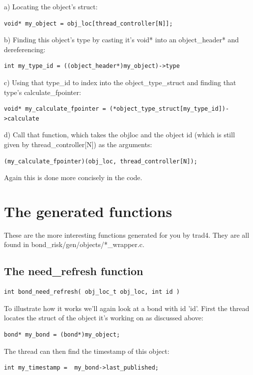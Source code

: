 \documentclass{report}
\begin{document}
a) Locating the object's struct:
\begin{verbatim}
void* my_object = obj_loc[thread_controller[N]];
\end{verbatim}

b) Finding this object's type by casting it's void* into an object_header* and dereferencing:
\begin{verbatim}
int my_type_id = ((object_header*)my_object)->type  
\end{verbatim}

c) Using that type_id to index into the object_type_struct and finding that type's calculate_fpointer:
\begin{verbatim}
void* my_calculate_fpointer = (*object_type_struct[my_type_id])->calculate
\end{verbatim}

d) Call that function, which takes the objloc and the object id (which is still given by thread_controller[N]) as the arguments:
\begin{verbatim}
(my_calculate_fpointer)(obj_loc, thread_controller[N]);
\end{verbatim}

Again this is done more concisely in the code.

\section{The generated functions}

These are the more interesting functions generated for you by trad4. They are all found in bond_risk/gen/objects/*_wrapper.c.

\subsection{The need_refresh function}

\begin{verbatim}
int bond_need_refresh( obj_loc_t obj_loc, int id )
\end{verbatim}

To illustrate how it works we'll again look at a bond with id 'id'.  First the thread locates the struct of the object it's working on as discussed above:

\begin{verbatim}
bond* my_bond = (bond*)my_object;
\end{verbatim}

The thread can then find the timestamp of this object:
\begin{verbatim}
int my_timestamp =  my_bond->last_published;
\end{verbatim}
\end{document}
